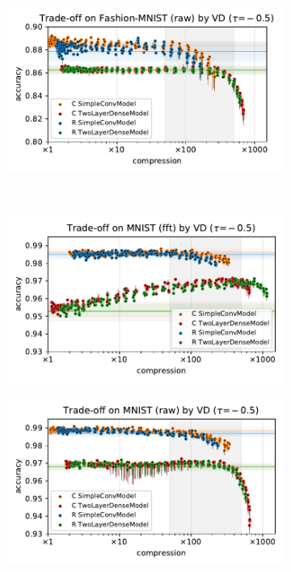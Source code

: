 \documentclass[a4paper,10pt,onecolumn]{article}
\begin{document}
\begin{figure}[b]
\begin{subfigure}[b]{0.5\columnwidth}
  \end{subfigure}%
  \begin{subfigure}[b]{0.5\columnwidth}
    \centering
    \includegraphics[width=\columnwidth]{figure__mnist-like__trade-off/appendix__VD__fashionmnist__raw__-0.5.pdf}
  \end{subfigure} \\ %
  \begin{subfigure}[b]{0.5\columnwidth}
    \centering
    \includegraphics[width=\columnwidth]{figure__mnist-like__trade-off/appendix__VD__mnist__fft__-0.5.pdf}
  \end{subfigure}%
  \begin{subfigure}[b]{0.5\columnwidth}
    \centering
    \includegraphics[width=\columnwidth]{figure__mnist-like__trade-off/appendix__VD__mnist__raw__-0.5.pdf}

\end{subfigure}
\end{figure}
\end{document}
